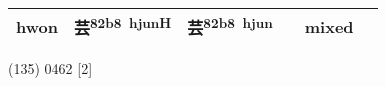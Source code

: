 \documentclass[14pt,a4paper]{scrartcl}
\begin{document}
\begin{longtable}[c]{@{}llllll@{}}
\begin{minipage}[t]{0.14\columnwidth}\raggedright\strut
hwon
\strut\end{minipage} &
\begin{minipage}[t]{0.14\columnwidth}\raggedright\strut
芸\textsuperscript{82b8~hjunH}
\strut\end{minipage} &
\begin{minipage}[t]{0.14\columnwidth}\raggedright\strut
芸\textsuperscript{82b8~hjun}
\strut\end{minipage} &
\begin{minipage}[t]{0.14\columnwidth}\raggedright\strut
\strut\end{minipage} &
\begin{minipage}[t]{0.14\columnwidth}\raggedright\strut
mixed
\strut\end{minipage}\tabularnewline
\bottomrule
\end{longtable}

(135) 0462 {[}2{]}
\end{document}
